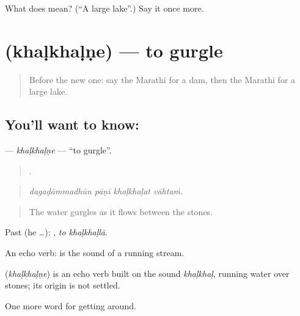 \begin{tcolorbox}[breakable,colback=teal!4,colframe=teal!35!black,title={Before you move on}]
What does  mean? (\textquotedblleft{}A large lake\textquotedblright{}.) Say it once more.
\end{tcolorbox}
\section[\texorpdfstring{\mr{खळखळणे} (khaḷkhaḷṇe)}{खळखळणे (khaḷkhaḷṇe)}]{ (khaḷkhaḷṇe) — to gurgle}

\label{lesson:MR-C443-khalkhalne}



\begin{quote}
Before the new one: say the Marathi for a dam, then the Marathi for a large lake.
\end{quote}

\subsection*{You'll want to know: }
\textbf{} — \emph{khaḷkhaḷṇe} — \textquotedblleft{}to gurgle\textquotedblright{}.

\begin{quote}
   .
\end{quote}

\begin{quote}
\emph{dagaḍāmmadhūn pāṇī khaḷkhaḷat vāhtaṁ.}
\end{quote}

\begin{quote}
The water gurgles as it flows between the stones.
\end{quote}

Past (he …):  , \emph{to khaḷkhaḷlā}.

An echo verb:  is the sound of a running stream.

\begin{cousinweb}
\textbf{} (\emph{khaḷkhaḷṇe}) is an echo verb built on the sound \emph{khaḷkhaḷ}, running water over stones; its origin is not settled.
\end{cousinweb}

\begin{grammarlens}[title={What you've built}]
One more word for getting around.
\end{grammarlens}

